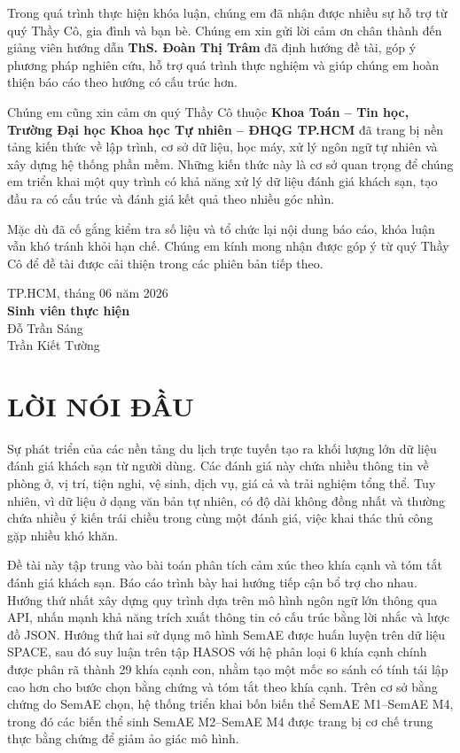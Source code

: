 \documentclass[12pt,a4paper]{report}
\newcommand{\universityname}{Trường Đại học Khoa học Tự nhiên -- ĐHQG TP.HCM}
\newcommand{\facultyname}{Khoa Toán -- Tin học}
\newcommand{\advisorname}{ThS. Đoàn Thị Trâm}
\newcommand{\cityname}{TP.HCM}
\newcommand{\reportyear}{2026}
\begin{document}
Trong quá trình thực hiện khóa luận, chúng em đã nhận được nhiều sự hỗ trợ từ quý Thầy Cô, gia đình và bạn bè. Chúng em xin gửi lời cảm ơn chân thành đến giảng viên hướng dẫn \textbf{\advisorname} đã định hướng đề tài, góp ý phương pháp nghiên cứu, hỗ trợ quá trình thực nghiệm và giúp chúng em hoàn thiện báo cáo theo hướng có cấu trúc hơn.

Chúng em cũng xin cảm ơn quý Thầy Cô thuộc \textbf{\facultyname, \universityname} đã trang bị nền tảng kiến thức về lập trình, cơ sở dữ liệu, học máy, xử lý ngôn ngữ tự nhiên và xây dựng hệ thống phần mềm. Những kiến thức này là cơ sở quan trọng để chúng em triển khai một quy trình có khả năng xử lý dữ liệu đánh giá khách sạn, tạo đầu ra có cấu trúc và đánh giá kết quả theo nhiều góc nhìn.

Mặc dù đã cố gắng kiểm tra số liệu và tổ chức lại nội dung báo cáo, khóa luận vẫn khó tránh khỏi hạn chế. Chúng em kính mong nhận được góp ý từ quý Thầy Cô để đề tài được cải thiện trong các phiên bản tiếp theo.

\begin{flushright}
\cityname, tháng 06 năm \reportyear\\
\textbf{Sinh viên thực hiện}\\
Đỗ Trần Sáng\\
Trần Kiết Tường
\end{flushright}

\clearpage

\chapter*{LỜI NÓI ĐẦU}

Sự phát triển của các nền tảng du lịch trực tuyến tạo ra khối lượng lớn dữ liệu đánh giá khách sạn từ người dùng. Các đánh giá này chứa nhiều thông tin về phòng ở, vị trí, tiện nghi, vệ sinh, dịch vụ, giá cả và trải nghiệm tổng thể. Tuy nhiên, vì dữ liệu ở dạng văn bản tự nhiên, có độ dài không đồng nhất và thường chứa nhiều ý kiến trái chiều trong cùng một đánh giá, việc khai thác thủ công gặp nhiều khó khăn.

Đề tài này tập trung vào bài toán phân tích cảm xúc theo khía cạnh và tóm tắt đánh giá khách sạn. Báo cáo trình bày hai hướng tiếp cận bổ trợ cho nhau. Hướng thứ nhất xây dựng quy trình dựa trên mô hình ngôn ngữ lớn thông qua API, nhấn mạnh khả năng trích xuất thông tin có cấu trúc bằng lời nhắc và lược đồ JSON. Hướng thứ hai sử dụng mô hình SemAE được huấn luyện trên dữ liệu SPACE, sau đó suy luận trên tập HASOS với hệ phân loại 6 khía cạnh chính được phân rã thành 29 khía cạnh con, nhằm tạo một mốc so sánh có tính tái lập cao hơn cho bước chọn bằng chứng và tóm tắt theo khía cạnh. Trên cơ sở bằng chứng do SemAE chọn, hệ thống triển khai bốn biến thể SemAE M1--SemAE M4, trong đó các biến thể sinh SemAE M2--SemAE M4 được trang bị cơ chế trung thực bằng chứng để giảm ảo giác mô hình.
\end{document}

